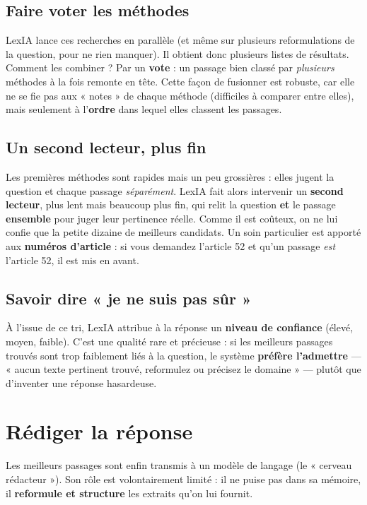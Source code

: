 \documentclass[11pt,a4paper]{article}
\begin{document}
\subsection{Faire voter les méthodes}
LexIA lance ces recherches en parallèle (et même sur plusieurs reformulations de la question, pour ne
rien manquer). Il obtient donc plusieurs listes de résultats. Comment les combiner ? Par un
\textbf{vote} : un passage bien classé par \emph{plusieurs} méthodes à la fois remonte en tête. Cette
façon de fusionner est robuste, car elle ne se fie pas aux « notes » de chaque méthode (difficiles à
comparer entre elles), mais seulement à l'\textbf{ordre} dans lequel elles classent les passages.

\subsection{Un second lecteur, plus fin}
Les premières méthodes sont rapides mais un peu grossières : elles jugent la question et chaque
passage \emph{séparément}. LexIA fait alors intervenir un \textbf{second lecteur}, plus lent mais
beaucoup plus fin, qui relit la question \textbf{et} le passage \textbf{ensemble} pour juger leur
pertinence réelle. Comme il est coûteux, on ne lui confie que la petite dizaine de meilleurs
candidats. Un soin particulier est apporté aux \textbf{numéros d'article} : si vous demandez
l'article 52 et qu'un passage \emph{est} l'article 52, il est mis en avant.

\subsection{Savoir dire « je ne suis pas sûr »}
À l'issue de ce tri, LexIA attribue à la réponse un \textbf{niveau de confiance} (élevé, moyen,
faible). C'est une qualité rare et précieuse : si les meilleurs passages trouvés sont trop faiblement
liés à la question, le système \textbf{préfère l'admettre} --- « aucun texte pertinent trouvé,
reformulez ou précisez le domaine » --- plutôt que d'inventer une réponse hasardeuse.

\section{Rédiger la réponse}

Les meilleurs passages sont enfin transmis à un modèle de langage (le « cerveau rédacteur »). Son
rôle est volontairement limité : il ne puise pas dans sa mémoire, il \textbf{reformule et structure}
les extraits qu'on lui fournit.
\end{document}
